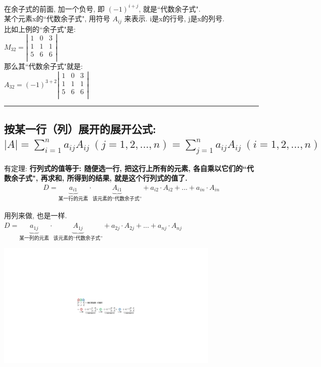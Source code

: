 \documentclass[UTF8]{ctexart}
\begin{document}
	在余子式的前面, 加一个负号, 即 $\left( -1 \right) ^{i+j}	$, 就是``代数余子式". \\
	 某个元素x的``代数余子式", 用符号 $A_{ij}$ 来表示. i是x的行号, j是x的列号.\\
	 
	比如上例的``余子式"是: \\
		$
	M_{32}=\left| \begin{matrix}
		1&		0&		3\\
		1&		1&		1\\
		5&		6&		6\\
	\end{matrix} \right|
	$ \\
	
	那么其``代数余子式"就是: \\
	$
	A_{32}=\left( -1 \right) ^{3+2}\left| \begin{matrix}
		1&		0&		3\\
		1&		1&		1\\
		5&		6&		6\\
	\end{matrix} \right|
	$ \\
	
	

	\hrule


\subsection{按某一行（列）展开的展开公式: \\ $|A|=\sum_{i=1}^n{a_{ij}A_{ij}\ \left( j=1,2,...,n \right)}=\sum_{j=1}^n{a_{ij}A_{ij}\ \left( i=1,2,...,n \right)}$	}

有定理: \textbf{行列式的值等于: 随便选一行, 把这行上所有的元素, 各自乘以它们的``代数余子式", 再求和, 所得到的结果, 就是这个行列式的值了.} 
\begin{align*}
	\boxed{
		D=\underset{\text{某一行的元素}}{\underbrace{a_{i1}}}\cdot \underset{\text{该元素的}\text{代数余子式}}{\underbrace{A_{i1}}}+a_{i2}\cdot A_{i2}+...+a_{in}\cdot A_{in}		
	}
\end{align*}
	
	用列来做, 也是一样. \\
	$
	D=\underset{\text{某一列的元素}}{\underbrace{a_{1j}}}\cdot \underset{\text{该元素的}\text{代数余子式}}{\underbrace{A_{1j}}}+a_{2j}\cdot A_{2j}+...+a_{nj}\cdot A_{nj}
	$	\\
	
	\begin{myEnvSample}
\includegraphics[width=0.8\textwidth]{img/0013.pdf}
	\end{myEnvSample}
	
\end{document}
